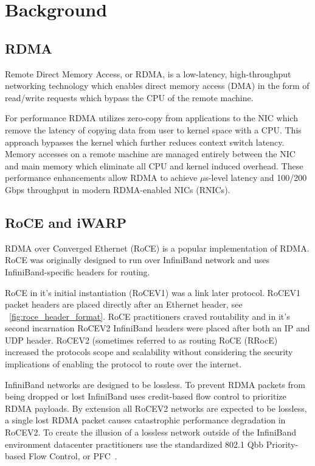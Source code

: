 \section{Background}
\label{sec:background}

\subsection{RDMA}

Remote Direct Memory Access, or RDMA, is a low-latency, high-throughput
networking technology which enables direct memory access (DMA) in the form of
read/write requests which bypass the CPU of the remote machine. 

For performance RDMA utilizes zero-copy from applications to the NIC which remove
the latency of copying data from user to kernel space with a CPU. This approach
bypasses the kernel which further reduces context switch latency.  Memory
accesses on a remote machine are managed entirely between the NIC and main
memory which eliminate all CPU and kernel induced overhead. These performance
enhancements allow RDMA to achieve $\mu$s-level latency and 100/200 Gbps
throughput in modern RDMA-enabled NICs (RNICs).

\subsection{RoCE and iWARP}

RDMA over Converged Ethernet (RoCE) is a popular implementation of RDMA. RoCE
was originally designed to run over InfiniBand network and uses
InfiniBand-specific headers for routing. 

RoCE in it's initial instantiation (RoCEV1) was a link later protocol. RoCEV1
packet headers are placed directly after an Ethernet header, see
~\ref{fig:roce_header_format}. RoCE practitioners craved routability and in it's
second incarnation RoCEV2 InfiniBand headers were placed after both an IP and
UDP header. RoCEV2 (sometimes referred to as routing RoCE (RRocE) increased the
protocols scope and scalability without considering the security implications of
enabling the protocol to route over the internet.

InfiniBand networks are designed to be lossless. To prevent RDMA packets from
being dropped or lost InfiniBand uses credit-based flow control to prioritize
RDMA payloads. By extension all RoCEV2 networks are expected to be lossless, a
single lost RDMA packet causes catastrophic performance degradation in RoCEV2.
To create the illusion of a lossless network outside of the InfiniBand
environment datacenter practitioners use the standardized 802.1 Qbb
Priority-based Flow Control, or PFC~\cite{802.1qbb}.

